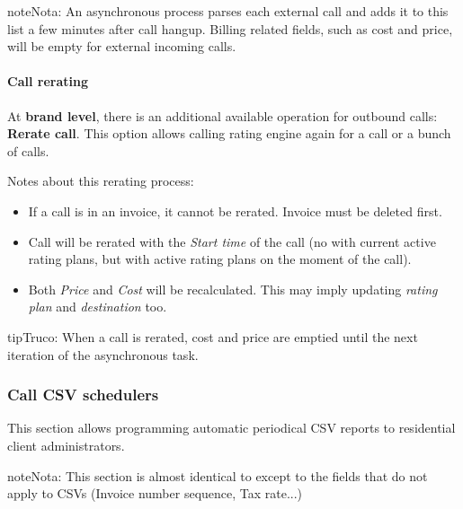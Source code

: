 \documentclass[letterpaper,10pt,spanish]{sphinxmanual}
\begin{document}
\begin{notice}{note}{Nota:}
An asynchronous process parses each external call and adds it to this list a few minutes after call hangup. Billing related fields, such as cost and price, will be empty for external incoming calls.
\end{notice}


\paragraph{Call rerating}
\label{administration_portal/client/residential/calls/external_calls:call-rerating}
At \textbf{brand level}, there is an additional available operation for outbound calls: \textbf{Rerate call}. This option allows calling rating engine again for a call or a bunch of calls.

Notes about this rerating process:
\begin{itemize}
\item {} 
If a call is in an invoice, it cannot be rerated. Invoice must be deleted first.

\item {} 
Call will be rerated with the \emph{Start time} of the call (no with current active rating plans, but with active rating plans
on the moment of the call).

\item {} 
Both \emph{Price} and \emph{Cost} will be recalculated. This may imply updating \emph{rating plan} and \emph{destination} too.

\end{itemize}

\begin{notice}{tip}{Truco:}
When a call is rerated, cost and price are emptied until the next iteration of the asynchronous task.
\end{notice}


\subsubsection{Call CSV schedulers}
\label{administration_portal/client/residential/calls/call_csv_schedulers:call-csv-schedulers}\label{administration_portal/client/residential/calls/call_csv_schedulers::doc}
This section allows programming automatic periodical CSV reports to residential client administrators.

\begin{notice}{note}{Nota:}
This section is almost identical to {\hyperref[administration_portal/brand/invoicing/invoice_schedulers:invoice\string-schedulers]{}} except to the
fields that do not apply to CSVs (Invoice number sequence, Tax rate...)
\end{notice}
\end{document}

